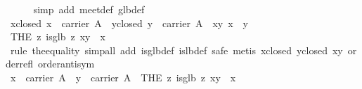 \begin{isabellebody}
%
\isadelimproof
\ \ \ \ %
\endisadelimproof
%
\isatagproof
{}\isamarkupfalse%
\ {}simp\ add{}\ meet{}def\ glb{}def{}\isanewline
\ \ \isamarkupfalse%
\isanewline
\ \ \ \ \isamarkupfalse%
\ x{}closed{}\ {}x\ {}\ carrier\ A{}\ \ y{}closed{}\ {}y\ {}\ carrier\ A{}\ \ xy{}\ {}x\ {}\ y{}\isanewline
\ \ \ \ \isamarkupfalse%
\ {}{}THE\ z{}\ is{}glb\ z\ {}x{}y{}{}\ {}\ x{}\isanewline
\ \ \ \ \ \ \isamarkupfalse%
\ {}rule\ the{}equality{}\ simp{}all\ add{}\ is{}glb{}def\ is{}lb{}def{}\ safe{}\ {}metis\ x{}closed\ y{}closed\ xy\ order{}refl\ order{}antisym{}{}{}\isanewline
\ \ \isamarkupfalse%
\isanewline
\ \ \ \ \isamarkupfalse%
\ {}x\ {}\ carrier\ A{}\ \ {}y\ {}\ carrier\ A{}\ \ {}{}THE\ z{}\ is{}glb\ z\ {}x{}y{}{}\ {}\ x{}\isanewline

\end{isabellebody}
